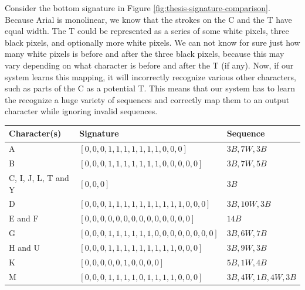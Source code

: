 Consider the bottom signature in Figure \ref{fig:thesis-signature-comparison}. Because Arial is monolinear, we know that the strokes on the C and the T have equal width. The T could be represented as a series of some white pixels, three black pixels, and optionally more white pixels. We can not know for sure just how many white pixels is before and after the three black pixels, because this may vary depending on what character is before and after the T (if any). Now, if our system learns this mapping, it will incorrectly recognize various other characters, such as parts of the C as a potential T. This means that our system has to learn the recognize a huge variety of sequences and correctly map them to an output character while ignoring invalid sequences.

\begin{table}[H]
    \centering
    \begin{tabular}{|l|l|l|}
        \hline 
        \textbf{Character(s)} & \textbf{Signature}                                    & \textbf{Sequence}            \\ \hline
        A                     & \([0, 0, 0, 1, 1, 1, 1, 1, 1, 1, 0, 0, 0]\)             & \(3B, 7W, 3B\)                 \\ \hline
        B                     & \([0, 0, 0, 1, 1, 1, 1, 1, 1, 1, 0, 0, 0, 0, 0]\)       & \(3B, 7W, 5B\)                 \\ \hline
        C, I, J, L, T and Y   & \([0, 0, 0]\)                                           & \(3B\)                         \\ \hline
        D                     & \([0, 0, 0, 1, 1, 1, 1, 1, 1, 1, 1, 1, 1, 0, 0, 0]\)    & \(3B, 10W, 3B\)                \\ \hline
        E and F               & \([0, 0, 0, 0, 0, 0, 0, 0, 0, 0, 0, 0, 0, 0]\)          & \(14B\)                        \\ \hline
        G                     & \([0, 0, 0, 1, 1, 1, 1, 1, 1, 0, 0, 0, 0, 0, 0, 0, 0]\) & \(3B, 6W, 7B\)                 \\ \hline
        H and U               & \([0, 0, 0, 1, 1, 1, 1, 1, 1, 1, 1, 1, 0, 0, 0]\)       & \(3B, 9W, 3B\)                 \\ \hline
        K                     & \([0, 0, 0, 0, 0, 1, 0, 0, 0, 0]\)                      & \(5B, 1W, 4B\)                 \\ \hline
        M                     & \([0, 0, 0, 1, 1, 1, 1, 0, 1, 1, 1, 1, 0, 0, 0]\)       & \(3B, 4W, 1B, 4W, 3B\)         \\ \hline

\end{tabular}
\end{table}
